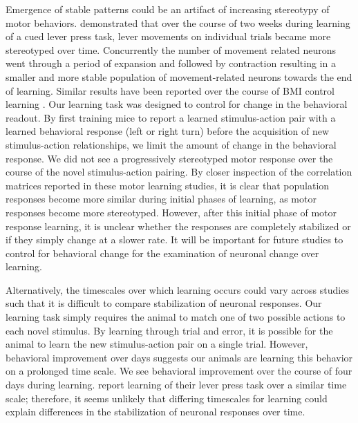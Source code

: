 Emergence of stable patterns could be an artifact of increasing stereotypy of motor behaviors. \citep{Peters2014} demonstrated that over the course of two weeks during learning of a cued lever press task, lever movements on individual trials became more stereotyped over time. Concurrently the number of movement related neurons went through a period of expansion and followed by contraction resulting in a smaller and more stable population of movement-related neurons towards the end of learning. Similar results have been reported over the course of BMI control learning \citep{Ganguly2009}. Our learning task was designed to control for change in the behavioral readout. By first training mice to report a learned stimulus-action pair with a learned behavioral response (left or right turn) before the acquisition of new stimulus-action relationships, we limit the amount of change in the behavioral response. We did not see a progressively stereotyped motor response over the course of the novel stimulus-action pairing. By closer inspection of the correlation matrices reported in these motor learning studies, it is clear that population responses become more similar during initial phases of learning, as motor responses become more stereotyped. However, after this initial phase of motor response learning, it is unclear whether the responses are completely stabilized or if they simply change at a slower rate. It will be important for future studies to control for behavioral change for the examination of neuronal change over learning.

\bigskip

Alternatively, the timescales over which learning occurs could vary across studies such that it is difficult to compare stabilization of neuronal responses. Our learning task simply requires the animal to match one of two possible actions to each novel stimulus. By learning through trial and error, it is possible for the animal to learn the new stimulus-action pair on a single trial. However, behavioral improvement over days suggests our animals are learning this behavior on a prolonged time scale. We see behavioral improvement over the course of four days during learning. \citep{Peters2014} report learning of their lever press task over a similar time scale; therefore, it seems unlikely that differing timescales for learning could explain differences in the stabilization of neuronal responses over time.

